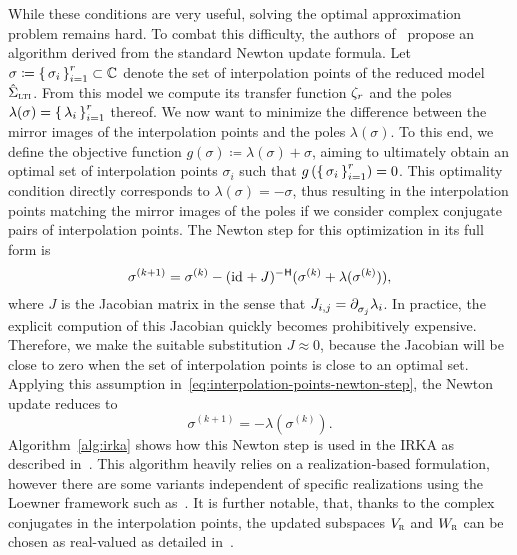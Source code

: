 While these conditions are very useful, solving the optimal approximation problem remains hard.
To combat this difficulty, the authors of~\cite{Gugercin2008} propose an algorithm derived from the standard Newton update formula.
Let $\sigma \coloneqq {\sset{\sigma_i}}_{i = 1}^r \subset \bb{C}$ denote the set of interpolation points of the reduced model $\hat{\Sigma}_\msc{lti}$.
From this model we compute its transfer function $\tfunc_r$ and the poles $\lambda(\sigma) = {\sset{\lambda_i}}_{i = 1}^r$ thereof.
We now want to minimize the difference between the mirror images of the interpolation points and the poles $\lambda(\sigma)$.
To this end, we define the objective function $g(\sigma) \coloneqq \lambda(\sigma) + \sigma$, aiming to ultimately obtain an optimal set of interpolation points $\sigma_i$ such that $g\left( {\sset{\sigma_i}}_{i = 1}^r \right) = 0$.
This optimality condition directly corresponds to $\lambda(\sigma) = -\sigma$, thus resulting in the interpolation points matching the mirror images of the poles if we consider complex conjugate pairs of interpolation points.
The Newton step for this optimization in its full form is
\begin{equation}\label{eq:interpolation-points-newton-step}
    \sigma^{(k + 1)} = \sigma^{(k)} - (\id + J)\inv (\sigma^{(k)} + \lambda(\sigma^{(k)})),
\end{equation}
where $J$ is the Jacobian matrix in the sense that $J_{i, j} = \pd[\sigma_j]{} \lambda_i$.
In practice, the explicit compution of this Jacobian quickly becomes prohibitively expensive.
Therefore, we make the suitable substitution $J \approx 0$, because the Jacobian will be close to zero when the set of interpolation points is close to an optimal set.
Applying this assumption in~\eqref{eq:interpolation-points-newton-step}, the Newton update reduces to
\begin{equation*}
    \sigma^{(k + 1)} = - \lambda(\sigma^{(k)}).
\end{equation*}
Algorithm~\ref{alg:irka} shows how this Newton step is used in the \acf{IRKA} as described in~\cite[Algorithm~4.1]{Gugercin2008}.
This algorithm heavily relies on a realization-based formulation, however there are some variants independent of specific realizations using the Loewner framework such as~\cite[Algorithm~7.2]{Beattie2017}.
It is further notable, that, thanks to the complex conjugates in the interpolation points, the updated subspaces $V_\msc{r}$ and $W_\msc{r}$ can be chosen as real-valued as detailed in~\cite[Remark~4]{Gugercin2012}.

